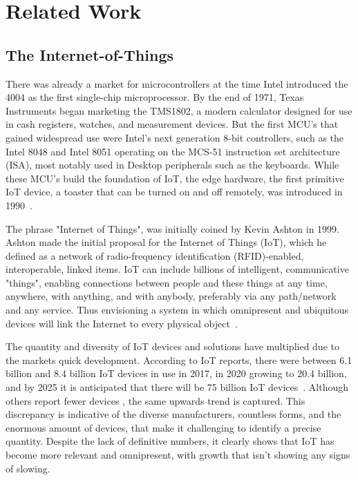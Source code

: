 \chapter{Related Work}

\section{The Internet-of-Things}

There was already a market for microcontrollers at the time Intel introduced the 4004 as the first single-chip microprocessor. By the end of 1971, Texas Instruments began marketing the TMS1802, a modern calculator designed for use in cash registers, watches, and measurement devices. But the first MCU's that gained widespread use were Intel's next generation 8-bit controllers, such as the Intel 8048 and Intel 8051 operating on the MCS-51 instruction set architecture (ISA), most notably used in Desktop peripherals such as the keyboards. While these MCU's build the foundation of IoT, the edge hardware, the first primitive IoT device, a toaster that can be turned on and off remotely, was introduced in 1990~\cite{7786805}.

The phrase "Internet of Things", was initially coined by Kevin Ashton in 1999. Ashton made the initial proposal for the Internet of Things (IoT), which he defined as a network of radio-frequency identification (RFID)-enabled, interoperable, linked items. IoT can include billions of intelligent, communicative "things", enabling connections between people and these things at any time, anywhere, with anything, and with anybody, preferably via any path/network and any service. Thus envisioning a system in which omnipresent and ubiquitous devices will link the Internet to every physical object~\cite{shin2014socio, wang2015introduction}.

The quantity and diversity of IoT devices and solutions have multiplied due to the markets quick development. According to IoT reports, there were between 6.1 billion and 8.4 billion IoT devices in use in 2017, in 2020 growing to 20.4 billion, and by 2025 it is anticipated that there will be 75 billion IoT devices~\cite{iot-size1, iot-size2}. Although others report fewer devices \cite{iot-size3}, the same upwards trend is captured. 
This discrepancy is indicative of the diverse manufacturers, countless forms, and the enormous amount of devices, that make it challenging to identify a precise quantity. 
%
Despite the lack of definitive numbers, it clearly shows that IoT has become more relevant and omnipresent, with growth that isn't showing any signs of slowing. 

